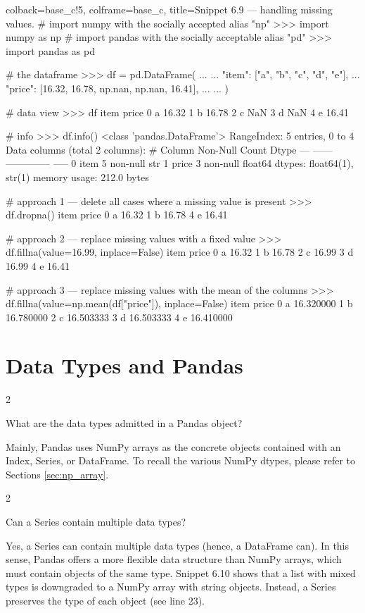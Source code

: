 \documentclass[a4paper,11pt]{book}
\newcommand{\question}[1]{%
    \begin{tcolorbox}[colback=comp_c!10,colframe=comp_c,sidebyside align=top,width=\linewidth,before skip=1ex]
        #1
    \end{tcolorbox}
    \switchcolumn%
}
\newcommand{\note}[1]{%
    \begin{tcolorbox}[colback=white!0,colframe=white!10,width=\linewidth,before skip=1ex]
        #1
    \end{tcolorbox}
}
\begin{document}
\begin{pythoncode}[linenos=True]{colback=base_c!5, colframe=base_c, title=\sffamily Snippet 6.9 --- handling missing values}.
# import numpy with the socially accepted alias "np"
>>> import numpy as np
# import pandas with the socially acceptable alias "pd"
>>> import pandas as pd

# the dataframe
>>> df = pd.DataFrame(
... 	{
... 	    "item": ["a", "b", "c", "d", "e"],
... 	    "price": [16.32, 16.78, np.nan, np.nan, 16.41],
... 	}
... )

# data view
>>> df
  item  price
0    a  16.32
1    b  16.78
2    c    NaN
3    d    NaN
4    e  16.41

# info
>>> df.info()
<class 'pandas.DataFrame'>
RangeIndex: 5 entries, 0 to 4
Data columns (total 2 columns):
 #   Column  Non-Null Count  Dtype  
---  ------  --------------  -----  
 0   item    5 non-null      str    
 1   price   3 non-null      float64
dtypes: float64(1), str(1)
memory usage: 212.0 bytes

# approach 1 --- delete all cases where a missing value is present
>>> df.dropna()
  item  price
0    a  16.32
1    b  16.78
4    e  16.41

# approach 2 --- replace missing values with a fixed value
>>> df.fillna(value=16.99, inplace=False)
  item  price
0    a  16.32
1    b  16.78
2    c  16.99
3    d  16.99
4    e  16.41

# approach 3 --- replace missing values with the mean of the columns
>>> df.fillna(value=np.mean(df["price"]), inplace=False)
  item      price
0    a  16.320000
1    b  16.780000
2    c  16.503333
3    d  16.503333
4    e  16.410000
\end{pythoncode}

\section{Data Types and Pandas} 

\begin{paracol}{2}
	\question{\raggedright What are the data types admitted in a Pandas object?}
	\note{Mainly, Pandas uses NumPy arrays as the concrete objects contained with an Index, Series, or DataFrame. To recall the various NumPy dtypes, please refer to Sections \ref{sec:np_array}.}
\end{paracol}

\begin{paracol}{2}
	\question{\raggedright Can a Series contain multiple data types?}
	\note{Yes, a Series can contain multiple data types (hence, a DataFrame can). In this sense, Pandas offers a more flexible data structure than NumPy arrays, which must contain objects of the same type. Snippet 6.10 shows that a list with mixed types is downgraded to a NumPy array with string objects. Instead, a Series preserves the type of each object (see line 23).}
\end{paracol}
\clearpage
\end{document}

